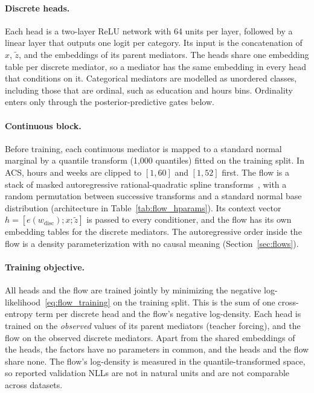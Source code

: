 \paragraph{Discrete heads.}
Each head is a two-layer ReLU network with 64 units per layer, followed by a
linear layer that outputs one logit per category. Its input is the
concatenation of $x$, $\tilde z$, and the embeddings of its parent mediators.
The heads share one embedding table per discrete mediator, so a mediator has
the same embedding in every head that conditions on it. Categorical mediators are modelled as
unordered classes, including those that are ordinal, such as education and
hours bins. Ordinality enters only through the posterior-predictive gates
below.

\paragraph{Continuous block.}
Before training, each continuous mediator is mapped to a standard normal
marginal by a quantile transform (1{,}000 quantiles) fitted on the training
split. In ACS, hours and weeks are clipped to $[1,60]$ and $[1,52]$ first.
The flow is a stack of masked autoregressive rational-quadratic spline
transforms~\citep{durkan2019neural}, with a random permutation between
successive transforms and a standard normal base distribution
(architecture in Table~\ref{tab:flow_hparams}). Its context vector
$h=[e(w_{\mathrm{disc}});x;\tilde z]$ is passed to every conditioner, and the
flow has its own embedding tables for the discrete mediators. The
autoregressive order inside the flow is a density parameterization with no
causal meaning (Section~\ref{sec:flows}).

\paragraph{Training objective.}
All heads and the flow are trained jointly by minimizing the negative
log-likelihood~\eqref{eq:flow_training} on the training split. This is the sum
of one cross-entropy term per discrete head and the flow's negative
log-density. Each head is trained on the \emph{observed} values of its parent
mediators (teacher forcing), and the flow on the observed discrete mediators.
Apart from the shared embeddings of the heads, the factors have no
parameters in common, and the heads and the flow share none. The flow's log-density is measured in the quantile-transformed space, so reported
validation NLLs are not in natural units and are not comparable across
datasets.


